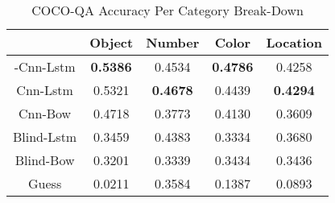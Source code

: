 \documentclass{article}
\renewcommand{\#}[1]{\textbf{#1}}
\begin{document}
\begin{table}[h]
\caption{COCO-QA Accuracy Per Category Break-Down}
\label{tab:cocoqa_acc_breakdown}
\vskip 0.15in
\begin{center}
\begin{small}
\begin{sc}
\begin{tabular}{c c c c c}
\hline
\abovespace\belowspace
           & Object    & Number   & Color    & Location \\
\hline
\abovespace
2-Cnn-Lstm & \#{0.5386}& 0.4534   &\#{0.4786}& 0.4258   \\
Cnn-Lstm   & 0.5321    &\#{0.4678}& 0.4439   &\#{0.4294}\\
Cnn-Bow    & 0.4718    & 0.3773   & 0.4130   & 0.3609   \\
Blind-Lstm & 0.3459    & 0.4383   & 0.3334   & 0.3680   \\
Blind-Bow  & 0.3201    & 0.3339   & 0.3434   & 0.3436   \\
\belowspace
Guess      & 0.0211    & 0.3584   & 0.1387   & 0.0893   \\
\hline
\end{tabular}
\end{sc}
\end{small}
\end{center}
\end{table}
\end{document}
